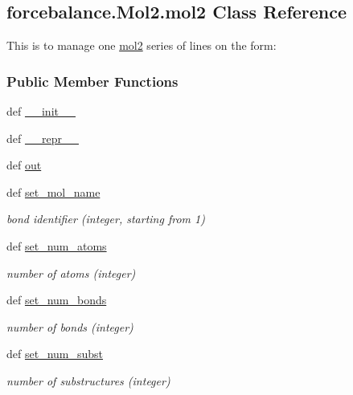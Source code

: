 \hypertarget{classforcebalance_1_1Mol2_1_1mol2}{\subsection{forcebalance.\-Mol2.\-mol2 \-Class \-Reference}
\label{classforcebalance_1_1Mol2_1_1mol2}
}


\-This is to manage one \hyperlink{classforcebalance_1_1Mol2_1_1mol2}{mol2} series of lines on the form\-:  


\subsubsection*{\-Public \-Member \-Functions}
\begin{DoxyCompactItemize}
\item 
def \hyperlink{classforcebalance_1_1Mol2_1_1mol2_ad2182f9984dda90dfbd036d70921d5d8}{\-\_\-\-\_\-init\-\_\-\-\_\-}
\item 
def \hyperlink{classforcebalance_1_1Mol2_1_1mol2_a74ecda4663b1adecb1eeb968c9240126}{\-\_\-\-\_\-repr\-\_\-\-\_\-}
\item 
def \hyperlink{classforcebalance_1_1Mol2_1_1mol2_a62f0118b061a2b68d655f8c11b060de8}{out}
\item 
def \hyperlink{classforcebalance_1_1Mol2_1_1mol2_a4055fdaf7ab9a93d60577a8ce4d91ce1}{set\-\_\-mol\-\_\-name}
\begin{DoxyCompactList}\small\item\em bond identifier (integer, starting from 1) \end{DoxyCompactList}\item 
def \hyperlink{classforcebalance_1_1Mol2_1_1mol2_a9aa06696da4a8e209bf5fca3acdf790b}{set\-\_\-num\-\_\-atoms}
\begin{DoxyCompactList}\small\item\em number of atoms (integer) \end{DoxyCompactList}\item 
def \hyperlink{classforcebalance_1_1Mol2_1_1mol2_a067b764ea4c695738f51bc5f995f6f73}{set\-\_\-num\-\_\-bonds}
\begin{DoxyCompactList}\small\item\em number of bonds (integer) \end{DoxyCompactList}\item 
def \hyperlink{classforcebalance_1_1Mol2_1_1mol2_a57bf99785e120a6aedd8be49585f4c5d}{set\-\_\-num\-\_\-subst}
\begin{DoxyCompactList}\small\item\em number of substructures (integer) \end{DoxyCompactList}\item 

\end{DoxyCompactItemize}
